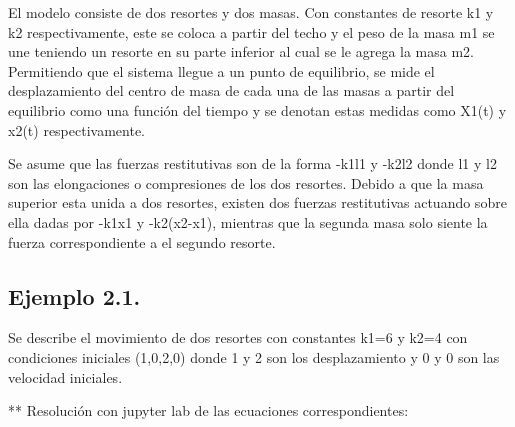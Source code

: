 \documentclass{article} %
\begin{document}
El modelo consiste de dos resortes y dos masas. Con constantes de resorte k1 y k2 respectivamente, este se coloca a partir del techo y el peso de la masa m1 se une teniendo un resorte en su parte inferior al cual se le agrega la masa m2. Permitiendo que el sistema llegue a un punto de equilibrio, se mide el desplazamiento del centro de masa de cada una de las masas a partir del equilibrio como una función del tiempo y se denotan estas medidas como X1(t) y x2(t) respectivamente. 

\vspace{0.5 cm}

Se asume que las fuerzas restitutivas son de la forma -k1l1 y -k2l2 donde l1 y l2 son las elongaciones o compresiones de los dos resortes. Debido a que la masa superior esta unida a dos resortes, existen dos fuerzas restitutivas actuando sobre ella dadas por -k1x1 y -k2(x2-x1), mientras que la segunda masa solo siente la fuerza correspondiente a el segundo resorte. 

\subsection{Ejemplo 2.1.}
Se describe el movimiento de dos resortes con constantes k1=6 y k2=4 con condiciones iniciales (1,0,2,0) donde 1 y 2 son los desplazamiento y 0 y 0 son las velocidad iniciales. 

\vspace{0.5 cm}

** Resolución con jupyter lab de las ecuaciones correspondientes:
\end{document}
